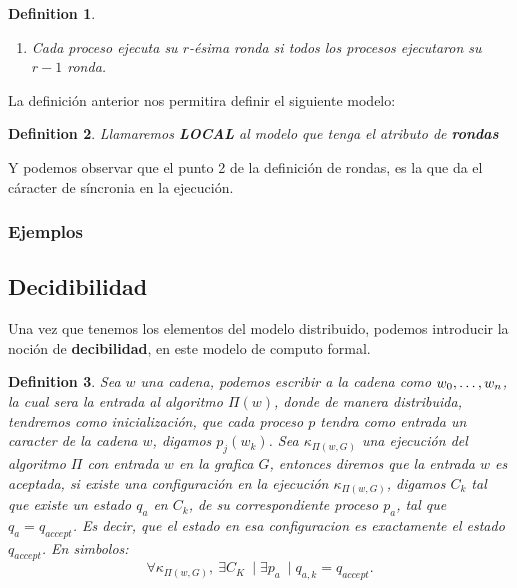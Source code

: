 \documentclass[10pt]{report}
\newtheorem{definition}{Definition}
\begin{document}
{\begin{definition}
\begin{enumerate}
            \item Cada proceso ejecuta su $r$-ésima ronda si todos los procesos ejecutaron su $r-1$ ronda.
        \end{enumerate}
    \end{definition}\newline
    La definición anterior nos permitira definir el siguiente modelo:
    \begin{definition}
        Llamaremos \textbf{LOCAL} al modelo que tenga el atributo de \textbf{rondas}
    \end{definition}
    Y podemos observar que el punto 2 de la definición de rondas, es la que da el cáracter de
    síncronia en la ejecución.
    \subsubsection{Ejemplos}


    \newpage
    \subsection{Decidibilidad}\label{subsec:decidibilidad}
    Una vez que tenemos los elementos del modelo distribuido, podemos introducir la noción de \textbf{decibilidad}, en
    este modelo de computo formal.

    \theoremstyle{definition}
    \begin{definition}
        Sea $w$ una cadena, podemos escribir a la cadena como $w_{0},\mathellipsis, w_{n}$, la cual sera la entrada al algoritmo
        $\Pi(w)$, donde de manera distribuida, tendremos como inicialización, que cada proceso $p$ tendra como entrada un caracter de la cadena $w$, digamos $p_{j}(w_{k})$.\newline
        Sea $\kappa_{\Pi(w,G)}$ una ejecución del algoritmo $\Pi$ con entrada $w$ en la grafica $G$, entonces diremos que
        la entrada $w$ es aceptada, si existe una configuración en la ejecución $\kappa_{\Pi(w,G)}$, digamos $C_{k}$ tal que
        existe un estado $q_{a}$ en $C_{k}$, de su correspondiente proceso $p_{a}$, tal que $q_{a}=q_{accept}$.\newline
        Es decir, que el estado en esa configuracion es exactamente el estado $q_{accept}$.\newline
        En simbolos:
        \begin{equation}
            \forall \kappa_{\Pi(w,G)},\ \exists C_{K}\ \mid \exists p_{a}\ \mid q_{a,k}=q_{accept}.\label{eq:equation4}
        \end{equation}
    \end{definition}

}
\end{document}
